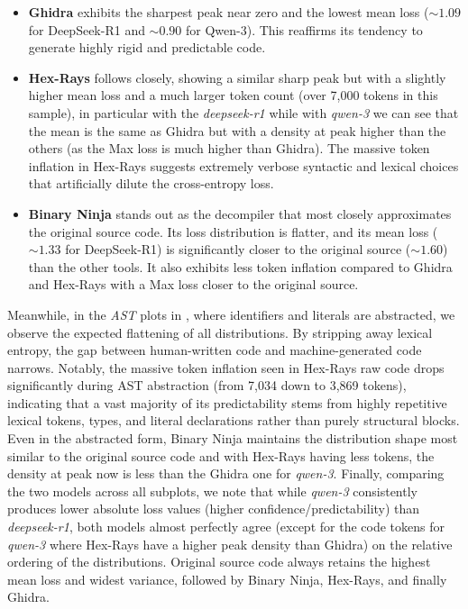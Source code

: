 \begin{itemize}
    \item \textbf{Ghidra} exhibits the sharpest peak near zero and the lowest mean loss ($\sim 1.09$ for DeepSeek-R1 and $\sim 0.90$ for Qwen-3). This reaffirms its tendency to generate highly rigid and predictable code.
    \item \textbf{Hex-Rays} follows closely, showing a similar sharp peak but with a slightly higher mean loss and a much larger token count (over 7,000 tokens in this sample), in particular with the \emph{deepseek-r1} while with \emph{qwen-3} we can see that the mean is the same as Ghidra but with a density at peak higher than the others (as the Max loss is much higher than Ghidra). The massive token inflation in Hex-Rays suggests extremely verbose syntactic and lexical choices that artificially dilute the cross-entropy loss.
    \item \textbf{Binary Ninja} stands out as the decompiler that most closely approximates the original source code. Its loss distribution is flatter, and its mean loss ($\sim 1.33$ for DeepSeek-R1) is significantly closer to the original source ($\sim 1.60$) than the other tools. It also exhibits less token inflation compared to Ghidra and Hex-Rays with a Max loss closer to the original source.
\end{itemize}

Meanwhile, in the \emph{AST} plots in , where identifiers and literals are abstracted, we observe the expected flattening of all distributions. By stripping away lexical entropy, the gap between human-written code and machine-generated code narrows. Notably, the massive token inflation seen in Hex-Rays raw code drops significantly during AST abstraction (from 7,034 down to 3,869 tokens), 
indicating that a vast majority of its predictability stems from highly repetitive lexical tokens, types, and literal declarations rather than purely structural blocks. Even in the abstracted form, Binary Ninja maintains the distribution shape most similar to the original source code and with Hex-Rays having less tokens, the density at peak now is less than the Ghidra one for \emph{qwen-3}. 
Finally, comparing the two models across all subplots, we note that while \emph{qwen-3} consistently produces lower absolute loss values (higher confidence/predictability) than \emph{deepseek-r1}, both models almost perfectly agree (except for the code tokens for \emph{qwen-3} where Hex-Rays have a higher peak density than Ghidra) on the relative ordering of the distributions. Original source code always retains the highest mean loss and widest variance, followed by Binary Ninja, Hex-Rays, and finally Ghidra. 

